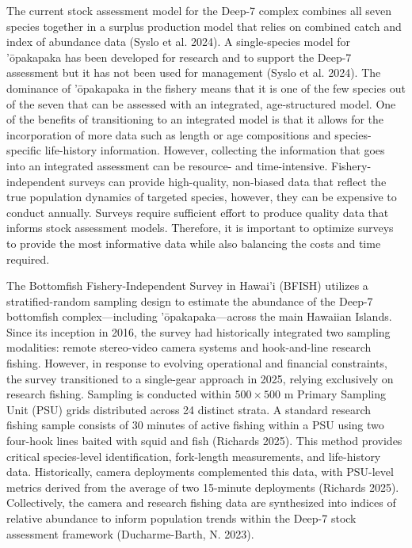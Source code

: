 \documentclass[
  letterpaper,
  12pt,
  letterpaper]{report}
\begin{document}
The current stock assessment model for the Deep-7 complex combines all
seven species together in a surplus production model that relies on
combined catch and index of abundance data (Syslo et al. 2024). A
single-species model for 'ōpakapaka has been developed for research and
to support the Deep-7 assessment but it has not been used for management
(Syslo et al. 2024). The dominance of 'ōpakapaka in the fishery means
that it is one of the few species out of the seven that can be assessed
with an integrated, age-structured model. One of the benefits of
transitioning to an integrated model is that it allows for the
incorporation of more data such as length or age compositions and
species-specific life-history information. However, collecting the
information that goes into an integrated assessment can be resource- and
time-intensive. Fishery-independent surveys can provide high-quality,
non-biased data that reflect the true population dynamics of targeted
species, however, they can be expensive to conduct annually. Surveys
require sufficient effort to produce quality data that informs stock
assessment models. Therefore, it is important to optimize surveys to
provide the most informative data while also balancing the costs and
time required.

The Bottomfish Fishery-Independent Survey in Hawai'i (BFISH) utilizes a
stratified-random sampling design to estimate the abundance of the
Deep-7 bottomfish complex---including 'ōpakapaka---across the main
Hawaiian Islands. Since its inception in 2016, the survey had
historically integrated two sampling modalities: remote stereo-video
camera systems and hook-and-line research fishing. However, in response
to evolving operational and financial constraints, the survey
transitioned to a single-gear approach in 2025, relying exclusively on
research fishing. Sampling is conducted within \(500 \times 500\) m
Primary Sampling Unit (PSU) grids distributed across 24 distinct strata.
A standard research fishing sample consists of 30 minutes of active
fishing within a PSU using two four-hook lines baited with squid and
fish (Richards 2025). This method provides critical species-level
identification, fork-length measurements, and life-history data.
Historically, camera deployments complemented this data, with PSU-level
metrics derived from the average of two 15-minute deployments (Richards
2025). Collectively, the camera and research fishing data are
synthesized into indices of relative abundance to inform population
trends within the Deep-7 stock assessment framework (Ducharme-Barth, N.
2023).
\end{document}
